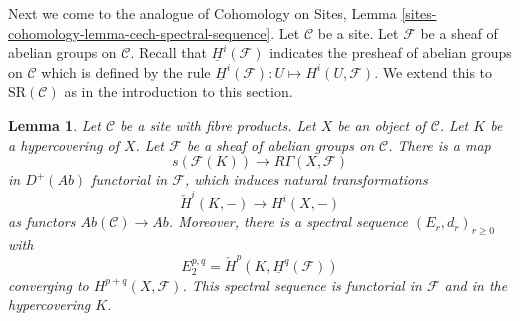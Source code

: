 \documentclass{stacks-project}
\theoremstyle{plain}
\newtheorem{lemma}[subsection]{Lemma}
\theoremstyle{definition}
\theoremstyle{remark}
\numberwithin{equation}{subsection}
\begin{document}
\noindent
Next we come to the analogue of Cohomology on Sites, Lemma
\ref{sites-cohomology-lemma-cech-spectral-sequence}.
Let $\mathcal{C}$ be a site.
Let $\mathcal{F}$ be a sheaf of abelian groups on $\mathcal{C}$.
Recall that $\underline{H}^i(\mathcal{F})$ indicates the presheaf
of abelian groups on $\mathcal{C}$ which is defined by the
rule $\underline{H}^i(\mathcal{F}) : U \longmapsto H^i(U, \mathcal{F})$.
We extend this to $\text{SR}(\mathcal{C})$ as in the introduction
to this section.

\begin{lemma}
\label{lemma-cech-spectral-sequence}
Let $\mathcal{C}$ be a site with fibre products.
Let $X$ be an object of $\mathcal{C}$.
Let $K$ be a hypercovering of $X$.
Let $\mathcal{F}$ be a sheaf of abelian groups on $\mathcal{C}$.
There is a map
$$
s(\mathcal{F}(K))
\longrightarrow
R\Gamma(X, \mathcal{F})
$$
in $D^{+}(\textit{Ab})$ functorial in $\mathcal{F}$, which induces
natural transformations
$$
\check{H}^i(K, -) \longrightarrow H^i(X, -)
$$
as functors $\textit{Ab}(\mathcal{C}) \to \textit{Ab}$. Moreover,
there is a spectral sequence $(E_r, d_r)_{r \geq 0}$ with
$$
E_2^{p, q} = \check{H}^p(K, \underline{H}^q(\mathcal{F}))
$$
converging to $H^{p + q}(X, \mathcal{F})$.
This spectral sequence is functorial in $\mathcal{F}$ and
in the hypercovering $K$.
\end{lemma}
\end{document}

